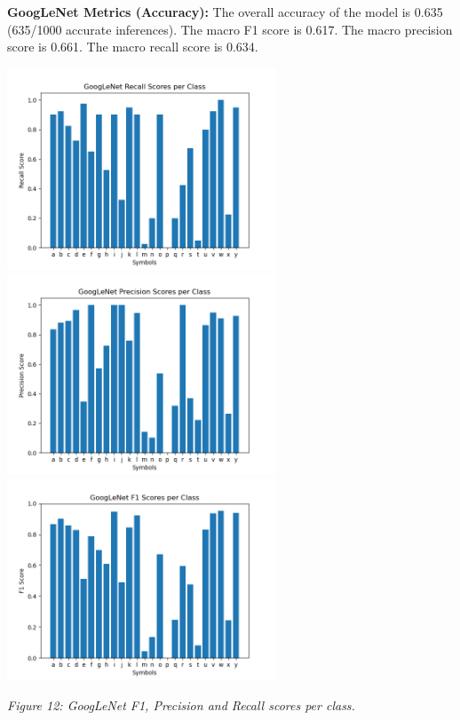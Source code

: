 \documentclass[11pt]{article}
\def\paraskip{\vskip 0.4cm}
\begin{document}
        \paraskip

        \noindent\textbf{GoogLeNet Metrics (Accuracy): } 
        The overall accuracy of the model is 0.635 (635/1000 accurate inferences). The macro F1 score is 0.617. The macro precision score is 0.661. The macro recall score is 0.634.

        \begin{center}
            \includegraphics[width=8cm]{images/gnetrecall.png}
            \includegraphics[width=8cm]{images/gnetprec.png}
            \\
            \includegraphics[width=8cm]{images/gnetf1.png}
            \\
            \raggedright \textit{
            Figure 12: GoogLeNet F1, Precision and Recall scores per class.
            }
        \end{center}
\end{document}
